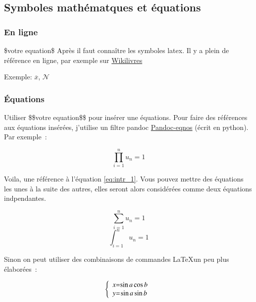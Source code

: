 \subsection*{Symboles mathématques et
équations}\label{symboles-mathuxe9matques-et-uxe9quations}

\subsubsection*{En ligne}\label{en-ligne}

\$votre equation\$ Après il faut connaître les symboles latex. Il y a
plein de référence en ligne, par exemple sur
\href{https://en.wikibooks.org/wiki/LaTeX/Mathematics}{Wikilivres}

Exemple: \(\overline{x}\), \(\mathcal{N}\)

\subsubsection*{Équations}\label{uxe9quations}

Utiliser \$\$votre equation\$\$ pour insérer une équations. Pour faire
des références aux équations insérées, j'utilise un filtre pandoc
\href{https://github.com/tomduck/pandoc-eqnos}{Pandoc-eqnos} (écrit en
python). Par exemple~:

\begin{equation}\prod_{i=1}^nu_n=1\label{eq:intr_1}\end{equation}

Voila, une référence à l'équation \ref{eq:intr_1}. Vous pouvez mettre
des équations les unes à la suite des autres, elles seront alors
considérées comme deux équations indpendantes.

\begin{equation}\sum_{i=1}^nu_n=1\label{eq:intr_2}\end{equation}
\begin{equation}\int_{i=1}^nu_n=1\label{eq:intr_3}\end{equation}

Sinon on peut utiliser des combinaisons de commandes \LaTeX un peu plus
élaborées~:

\begin{equation}
\left \{
\begin{array}{c @{=} c}
    x & \sin a \cos b \\
    y & \sin a \sin b \\
\end{array}
\right.
\label{eq:intr_4}\end{equation}

